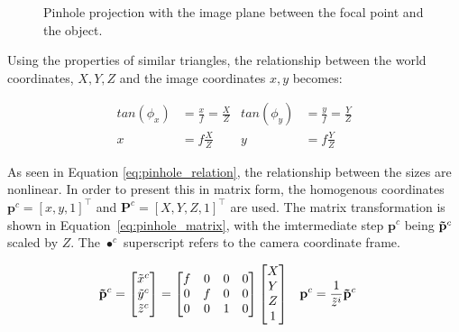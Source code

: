 \begin{figure}[!htb]

    \caption{Pinhole projection with the image plane between the focal point and the object.}
    \label{fig:pinhole}
    
\end{figure}

Using the properties of similar triangles, the relationship between the world coordinates, $X,Y,Z$ and the image coordinates $x,y$ becomes:

\begin{align}
    tan(\phi_x) &= \frac{x}{f} = \frac{X}{Z} & tan(\phi_y) &= \frac{y}{f} = \frac{Y}{Z} \label{eq:pinhole_tan_relation} \\
    x &= f\frac{X}{Z} & y &=f\frac{Y}{Z}
    \label{eq:pinhole_relation}
\end{align}

As seen in Equation \eqref{eq:pinhole_relation}, the relationship between the sizes are nonlinear. In order to present this in matrix form, the homogenous coordinates $\mathbf{p}^c=[x,y,1]^\top$ and $\mathbf{P}^c=[X,Y,Z,1]^\top$ are used. The matrix transformation is shown in Equation~\eqref{eq:pinhole_matrix}, with the imtermediate step $\mathbf{p}^c$ being $\mathbf{\Tilde{p}}^c$ scaled by $Z$. The $\bullet^c$ superscript refers to the camera coordinate frame.

\begin{align}
    \mathbf{\Tilde{p}}^c &= \begin{bmatrix}
        \Tilde{x}^c \\ \Tilde{y}^c \\ \Tilde{z}^c
    \end{bmatrix} = \begin{bmatrix}
        f & 0 & 0 & 0 \\
        0 & f & 0 & 0 \\
        0 & 0 & 1 & 0
    \end{bmatrix}\begin{bmatrix}
        X \\ Y \\ Z \\ 1
    \end{bmatrix} &
    \mathbf{p}^c &= \frac{1}{\Tilde{z}^i}\mathbf{\Tilde{p}}^c
    \label{eq:pinhole_matrix}
\end{align}

